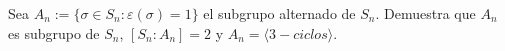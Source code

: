 \question 
Sea $A_n := \{\sigma \in S_n: \varepsilon(\sigma)=1\}$ el subgrupo alternado de $S_n$. Demuestra que $A_n$ es subgrupo de $S_n$, $[S_n:A_n]=2$ y $A_n=\langle {3-ciclos} \rangle$. 